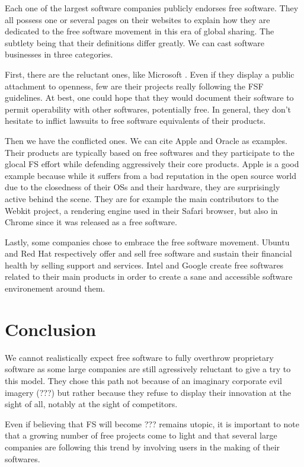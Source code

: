 \documentclass[12pt]{article}
\begin{document}
Each one of the largest software companies publicly endorses free
software. They all possess one or several pages on their websites to
explain how they are dedicated to the free software movement in this
era of global sharing. The subtlety being that their definitions
differ greatly. We can cast software businesses in three categories.

First, there are the reluctant ones, like Microsoft \cite{woss}. Even
if they display a public attachment to openness, few are their
projects really following the FSF guidelines. At best, one could hope
that they would document their software to permit operability with
other softwares, potentially free. In general, they don't hesitate to
inflict lawsuits to free software equivalents of their products.

Then we have the conflicted ones. We can cite Apple and Oracle as
examples. Their products are typically based on free softwares and
they participate to the glocal FS effort while defending aggressively
their core products. Apple is a good example because while it suffers
from a bad reputation in the open source world due to the closedness
of their OSs and their hardware, they are surprisingly active behind
the scene. They are for example the main contributors to the Webkit
project, a rendering engine used in their Safari browser, but also in
Chrome since it was released as a free software.

Lastly, some companies chose to embrace the free software
movement. Ubuntu and Red Hat respectively offer and sell free software
and sustain their financial health by selling support and
services. Intel and Google create free softwares related to their main
products in order to create a sane and accessible software
environement around them.

\section*{Conclusion}

We cannot realistically expect free software to fully overthrow
proprietary software as some large companies are still agressively
reluctant to give a try to this model.  They chose this path not
because of an imaginary corporate evil imagery (???) but rather
because they refuse to display their innovation at the sight of all,
notably at the sight of competitors.

Even if believing that FS will become ??? remains utopic, it is
important to note that a growing number of free projects come to light
and that several large companies are following this trend by involving
users in the making of their softwares.
\end{document}
